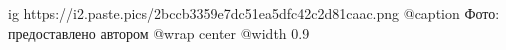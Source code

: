  
 
 
 
 

\ifcmt
  ig https://i2.paste.pics/2bccb3359e7dc51ea5dfc42c2d81caac.png
	@caption Фото: предоставлено автором
  @wrap center
  @width 0.9
\fi
